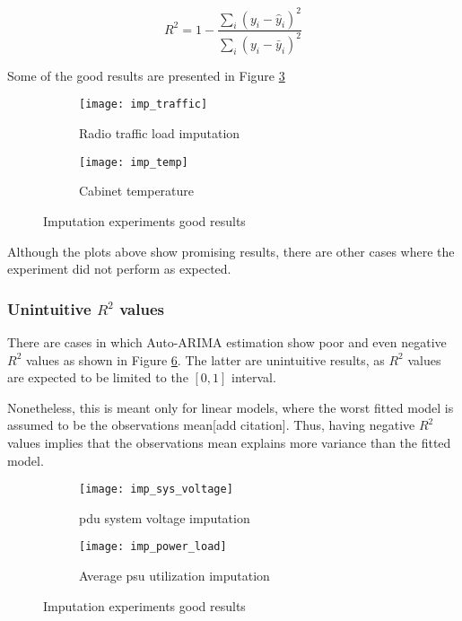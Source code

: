 \begin{equation}\label{eq:R2}
	R^2 = 1 - \frac{\sum_{i}{(y_i - \hat{y}_i)^2}}{\sum_{i}{(y_i - \bar{y}_i)^2}}
\end{equation}

Some of the good results are presented in Figure \ref{fig:imp_exp_good}


\begin{figure}[hptb]
	\begin{subfigure}{.47\textwidth}
		\texttt{[image: imp\_traffic]}
		\caption{Radio traffic load imputation}
		\label{fig:imp_radio_traffic}
	\end{subfigure}%
	\hfill
	\begin{subfigure}{.47\textwidth}
		\texttt{[image: imp\_temp]}
		\caption{Cabinet temperature}
		\label{fig:imp_temp}
	\end{subfigure}
	\caption{Imputation experiments good results}
	\label{fig:imp_exp_good}
\end{figure}

Although the plots above show promising results, there are other cases where the experiment did not perform as expected. 

\pagebreak

\subsubsection*{Unintuitive $R^2$ values}

There are cases in which Auto-ARIMA estimation show poor and even negative $R^2$ values as shown in Figure \ref{fig:imp_exp_issue}. The latter are unintuitive results, as $R^2$ values are expected to be limited to the $[0,1]$ interval. 

Nonetheless, this is meant only for linear models, where the worst fitted model is assumed to be the observations mean[add citation]. Thus, having negative $R^2$ values implies that the observations mean explains more variance than the fitted model.

\begin{figure}[hptb]
	\begin{subfigure}{.47\textwidth}
		\texttt{[image: imp\_sys\_voltage]}
		\caption{\ac{pdu} system voltage imputation}
		\label{fig:imp_pdu_sys_voltage}
	\end{subfigure}%
	\hfill
	\begin{subfigure}{.47\textwidth}
		\texttt{[image: imp\_power\_load]}
		\caption{Average \ac{psu} utilization imputation}
		\label{fig:imp_psu_load}
	\end{subfigure}
	\caption{Imputation experiments good results}
	\label{fig:imp_exp_issue}
\end{figure}

